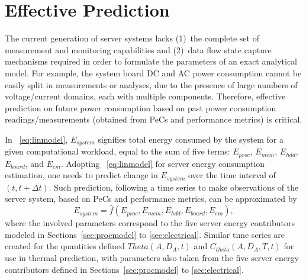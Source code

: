 % 
%
\chapter{Effective Prediction}
\label{chp:application}
The current generation of server systems lacks (1)~the complete set of
measurement and monitoring capabilities and (2)~data flow state capture
mechanisms required in order to formulate the parameters of an exact
analytical model.  For example, the system board DC and AC power
consumption cannot be easily split in measurements or analyses, due to
the presence of large numbers of voltage/current domains, each with
multiple components.  Therefore, effective prediction on future power
consumption based on past power consumption readings/measurements
(obtained from PeCs and performance metrics) is critical.

In \equationname~\eqref{eq:linmodel}, $E_{system}$ signifies total
energy consumed by the system for a given computational workload, equal
to the sum of five terms: $E_{proc}$, $E_{mem}$, $E_{hdd}$, $E_{board}$,
and $E_{em}$.  Adopting \equationname~\eqref{eq:linmodel} for server
energy consumption estimation, one needs to predict change in
$E_{system}$ over the time interval of $(t, t+\Delta t)$.  Such
prediction, following a time series to make observations of the server
system, based on PeCs and performance metrics, can be approximated by
\begin{equation}
\label{eq:tseries}
E_{system} = \hat{f}(E_{proc}, E_{mem}, E_{hdd}, E_{board}, E_{em}),
\end{equation}
where the involved parameters correspond to the five server energy
contributors modeled in Sections~\ref{sec:procmodel} to
\ref{sec:electrical}. Similar time series are created for the quantities
defined $Theta(A,D_{A},t)$ and $C_{theta}(A,D_{A},T,t)$ for use in
thermal prediction, with parameters also taken from the five server
energy contributors defined in Sections~\ref{sec:procmodel} to
\ref{sec:electrical}.

